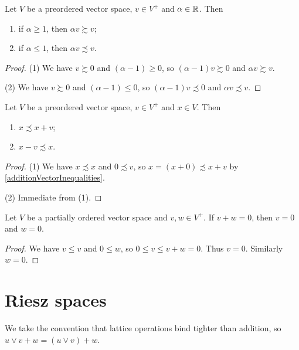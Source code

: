 \begin{lemma} \label{scalarMultiplicationInequalities}
Let $V$ be a preordered vector space, $v\in V^+$ and $\alpha\in \mathbb{R}$. Then
\begin{enumerate}
\item if $\alpha \geq 1$, then $\alpha v \succsim v$;
\item if $\alpha \leq 1$, then $\alpha v \precsim v$.
\end{enumerate}
\end{lemma}
\begin{proof}
(1) We have $v\succsim 0$ and $(\alpha-1) \geq 0$, so $(\alpha-1)v \succsim 0$ and $\alpha v \succsim v$.

(2) We have $v\succsim 0$ and $(\alpha-1) \leq 0$, so $(\alpha-1)v \precsim 0$ and $\alpha v \precsim v$.
\end{proof}

\begin{lemma} \label{positiveVectorAddition}
Let $V$ be a preordered vector space, $v\in V^+$ and $x\in V$. Then
\begin{enumerate}
\item $x \precsim x+v$;
\item $x - v \precsim x$.
\end{enumerate}
\end{lemma}
\begin{proof}
(1) We have $x\precsim x$ and $0\precsim v$, so $x = (x+0)\precsim x+v$ by \ref{additionVectorInequalities}.

(2) Immediate from (1).
\end{proof}

\begin{lemma} \label{positiveElementsSumToZeroImpliesZero}
Let $V$ be a partially ordered vector space and $v,w\in V^+$. If $v+w = 0$, then $v = 0$ and $w = 0$.
\end{lemma}
\begin{proof}
We have $v \leq v$ and $0\leq w$, so $0\leq v\leq v+w = 0$. Thus $v = 0$. Similarly $w = 0$.
\end{proof}

\section{Riesz spaces}

We take the convention that lattice operations bind tighter than addition, so $u\vee v + w = (u\vee v) + w$.

